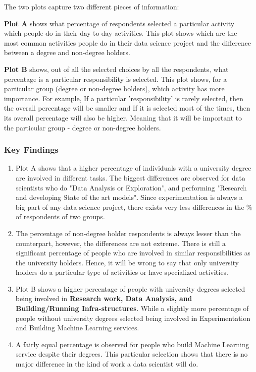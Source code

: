 The two plots capture two different pieces of information:
\begin{importantbox}
    \textbf{Plot A} shows what percentage of respondents selected a particular activity which people do in their day to day activities. This plot shows which are the most common activities people do in their data science project and the difference between a degree and non-degree holders.
\end{importantbox}
\begin{importantbox}
    \textbf{Plot B} shows, out of all the selected choices by all the respondents, what percentage is a particular responsibility is selected. This plot shows, for a particular group (degree or non-degree holders), which activity has more importance. For example, If a particular 'responsibility' is rarely selected, then the overall percentage will be smaller and If it is selected most of the times, then its overall percentage will also be higher. Meaning that it will be important to the particular group - degree or non-degree holders.
\end{importantbox}
\subsubsection{Key Findings}
\begin{enumerate}
    \item Plot A shows that a higher percentage of individuals with a university degree are involved in different tasks. The biggest differences are observed for data scientists who do "Data Analysis or Exploration", and performing "Research and developing State of the art models". Since experimentation is always a big part of any data science project, there exists very less differences in the \% of respondents of two groups.
    \item The percentage of non-degree holder respondents is always lesser than the counterpart, however, the differences are not extreme. There is still a significant percentage of people who are involved in similar responsibilities as the university holders. Hence, it will be wrong to say that only university holders do a particular type of activities or have specialized activities.
    \item Plot B shows a higher percentage of people with university degrees selected being involved in \textbf{Research work, Data Analysis, and Building/Running Infra-structures}. While a slightly more percentage of people without university degrees selected being involved in Experimentation and Building Machine Learning services.
    \item A fairly equal percentage is observed for people who build Machine Learning service despite their degrees. This particular selection shows that there is no major difference in the kind of work a data scientist will do.
\end{enumerate}

